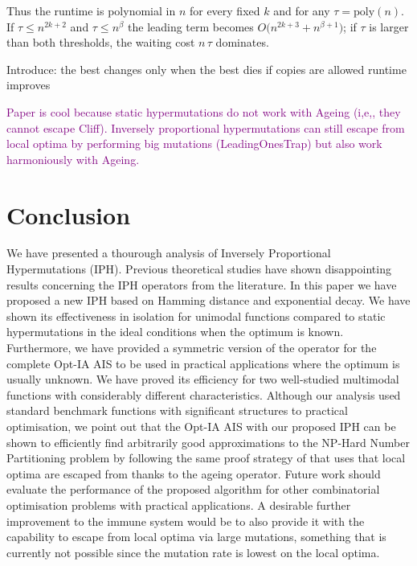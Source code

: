 \documentclass[lettersize,journal]{IEEEtran}
\begin{document}
	Thus the runtime is polynomial in \(n\) for every fixed \(k\) and for any
\(\tau=\mathrm{poly}(n)\).  If \(\tau\le n^{2k+2}\) and
\(\tau\le n^{\beta}\) the leading term becomes
\(O\!\bigl(n^{2k+3}+n^{\beta+1}\bigr)\);  
if \(\tau\) is larger than both thresholds, the waiting cost \(n\,\tau\)
dominates.

Introduce: the best changes only when the best dies
if copies are allowed runtime improves

\textcolor{purple}{Paper is cool because static hypermutations do not work with Ageing (i,e,, they cannot escape Cliff). Inversely proportional hypermutations can still escape from local optima by performing big mutations (LeadingOnesTrap) but also work harmoniously with Ageing.}

\section{Conclusion}
We have presented a thourough analysis of Inversely Proportional Hypermutations (IPH).
Previous theoretical studies have shown disappointing results concerning the IPH operators from the literature.
In this paper we have proposed a new IPH based on Hamming distance and exponential decay.
We have shown its effectiveness in isolation for unimodal functions compared to static hypermutations in the ideal conditions when the optimum is known.
Furthermore, we have provided a symmetric version of the operator for the complete Opt-IA AIS to be used in practical applications where the optimum is usually unknown.
We have proved its efficiency for two well-studied multimodal functions with considerably different characteristics.
Although our analysis used standard benchmark functions with significant structures to practical optimisation, we point out that the Opt-IA AIS with our proposed IPH can be shown to efficiently find arbitrarily good approximations to the NP-Hard Number Partitioning problem by following the same proof strategy of \cite{CorusOlivetoYazdaniAIJ2019} that uses that local optima are escaped from thanks to the ageing operator.
Future work should evaluate the performance of the proposed algorithm for other combinatorial optimisation problems with practical applications. A desirable further improvement to the immune system would be to also provide it with the capability to escape from local optima via large mutations, something that is currently not possible since the mutation rate is lowest on the local optima.

\end{document}
